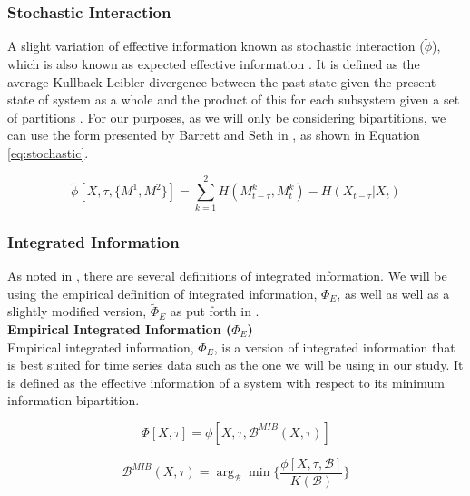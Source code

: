 \documentclass[a4paper,11pt]{article}
\begin{document}
\subsubsection{Stochastic Interaction}
\label{sec:bg:stochastic}

A slight variation of effective information known as stochastic interaction ($\tilde{\phi}$), which is also known as expected effective information \cite{Barrett2011}. It is defined as the average Kullback-Leibler divergence between the past state given the present state of system as a whole and the product of this for each subsystem given a set of partitions \cite{Ay2015}. For our purposes, as we will only be considering bipartitions, we can use the form presented by Barrett and Seth in \cite{Barrett2011}, as shown in Equation \ref{eq:stochastic}.

\begin{equation} \label{eq:stochastic}
\tilde{\phi} [X, \tau, \{M^1, M^2\}] = \sum_{k=1}^{2} H(M_{t-\tau}^k, M_{t}^k)  - H(X_{t-\tau} | X_t)
\end{equation}

\subsubsection{Integrated Information}
\label{II}

As noted in \cite{Barrett2011}, there are several definitions of integrated information. We will be using the empirical definition of integrated information, $\Phi_{E}$, as well as well as a slightly modified version, $\widetilde{\Phi}_{E}$ as put forth in \cite{Barrett2011}.\\

\noindent\textbf{Empirical Integrated Information ($\Phi_{E}$)}\\[2.5mm]
\noindent Empirical integrated information, $\Phi_{E}$, is a version of integrated information that is best suited for time series data such as the one we will be using in our study. It is defined as the effective information of a system with respect to its minimum information bipartition.

\begin{equation} \label{eq:ii}
\Phi [X, \tau] = \phi [X, \tau, \mathcal{B}^{MIB}(X, \tau)]
\end{equation}

\begin{equation} \label{eq:mib}
\mathcal{B}^{MIB}(X, \tau) = \arg_{\mathcal{B}} \min \Big\lbrace \frac{\phi [X, \tau, \mathcal{B}]}{K(\mathcal{B})} \Big\rbrace
\end{equation}
\end{document}

